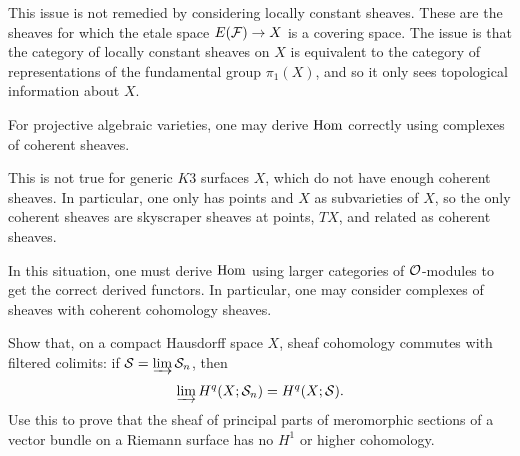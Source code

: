 \documentclass[12pt]{article}
\begin{document}
\begin{remark}
    This issue is not remedied by considering locally constant sheaves. These are the sheaves for which the etale space $E({\mathcal{F}}) \to X$ is a covering space. The issue is that the category of locally constant sheaves on $X$ is equivalent to the category of representations of the fundamental group $\pi_1(X)$, and so it only sees topological information about $X$.
\end{remark}

\begin{remark}
    For projective algebraic varieties, one may derive $\operatorname{Hom}$ correctly using complexes of coherent sheaves. 

    This is not true for generic $K3$ surfaces $X$, which do not have enough coherent sheaves. In particular, one only has points and $X$ as subvarieties of $X$, so the only coherent sheaves are skyscraper sheaves at points, $TX$, and related as coherent sheaves. 

    In this situation, one must derive $\operatorname{Hom}$ using larger categories of ${\mathcal{O}}$-modules to get the correct derived functors. In particular, one may consider complexes of sheaves with coherent cohomology sheaves.
\end{remark}

\begin{exercise}\label{ex:coh-filtered-colimits}
Show that, on a compact Hausdorff space $X$, sheaf cohomology commutes with filtered colimits: if $\mathcal{S} = \varinjlim \mathcal{S}_n$, then
\[
\varinjlim H^q(X; \mathcal{S}_n) = H^q(X; \mathcal{S}).
\]
Use this to prove that the sheaf of principal parts of meromorphic sections of a vector bundle on a Riemann surface has no $H^1$ or higher cohomology.
\end{exercise}
\end{document}
